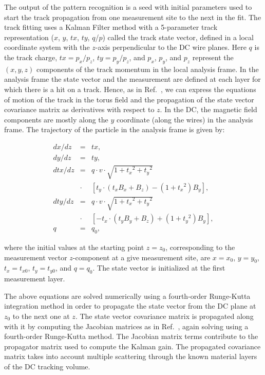 The output of the pattern recognition is a seed with initial parameters used to start the track propagation from one
measurement site to the next in the fit. The track fitting uses a Kalman Filter method with a 5-parameter track
representation ($x$, $y$, $tx$, $ty$, $q$/$p$) called the track state vector, defined in a local coordinate system
with the $z$-axis perpendicular to the DC wire planes. Here $q$ is the track charge, $tx=p_x/p_z$, $ty=p_y/p_z$,
and $p_x$, $p_y$, and $p_z$ represent the $(x,y,z)$ components of the track momentum in the local analysis frame.
In the analysis frame the state vector and the measurement are defined at each layer for which there is a hit on a
track. Hence, as in Ref.~\cite{spiri}, we can express the equations of motion of the track in the torus field and the
propagation of the state vector covariance matrix as derivatives with respect to $z$. In the DC, the magnetic field
components are mostly along the $y$ coordinate (along the wires) in the analysis frame. The trajectory of the particle
in the analysis frame is given by:

\begin{eqnarray}
dx/dz  &=& tx, \nonumber \\
dy/dz  &=&  ty, \nonumber \\
dtx/dz &=& q \cdot v \cdot \sqrt{1 + {t_x}^2 + {t_y}^2}  \nonumber \\
       &\cdot&\!\!\!\!\! [t_y\cdot (t_x B_x + B_z) - (1 + {t_x}^2 ) B_y],  \nonumber \\
dty/dz  &=&  q \cdot v \cdot \sqrt{1 + {t_x}^2 + {t_y}^2} \nonumber \\
      &\cdot&\!\!\!\!\! [-t_x\cdot (t_y B_y + B_z) + (1 + {t_y}^2 ) B_y], \nonumber \\
q  &=&  q_0,
\end{eqnarray}

\noindent
where the initial values at the starting point $z = z_0$, corresponding to the measurement vector $z$-component at a give measurement site,  are $x = x_0$, $y = y_0$, $t_x = t_{x0}$, $t_y = t_{y0}$,
and $q = q_0$.  The state vector is initialized at the first measurement layer. 

The above equations are solved numerically using a fourth-order Runge-Kutta integration method in order to
propagate the state vector from the DC plane at $z_0$ to the next one at $z$.  The state vector covariance
matrix is propagated along with it by computing the Jacobian matrices as in Ref.~\cite{spiri}, again solving using
a fourth-order Runge-Kutta method. The Jacobian matrix terms contribute to the propagator matrix used to
compute the Kalman gain. The propagated covariance matrix takes into account multiple scattering through the
known material layers of the DC tracking volume.

